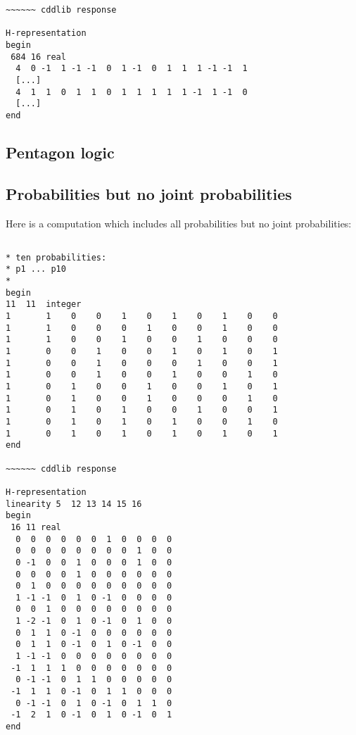 \documentclass[%
 showpacs,
 showkeys,
 preprintnumbers,
 amsmath,amssymb,
 aps,
  pra,
  longbibliography,
 floatfix,
 ]{revtex4-1}
\begin{document}
{\begin{lstlisting}[backgroundcolor=\color{yellow!10},framerule=0pt,breaklines=true, frame=tb]
~~~~~~ cddlib response

H-representation
begin
 684 16 real
  4  0 -1  1 -1 -1  0  1 -1  0  1  1  1 -1 -1  1
  [...]
  4  1  1  0  1  1  0  1  1  1  1  1 -1  1 -1  0
  [...]
end

\end{lstlisting}  }


\subsection{Pentagon logic}

\subsection{Probabilities but no joint probabilities}

Here is a computation which includes all probabilities but no joint probabilities:



{ \begin{lstlisting}[backgroundcolor=\color{yellow!10},framerule=0pt,breaklines=true, frame=tb]

* ten probabilities:
* p1 ... p10
*
begin
11  11  integer
1       1    0    0    1    0    1    0    1    0    0
1       1    0    0    0    1    0    0    1    0    0
1       1    0    0    1    0    0    1    0    0    0
1       0    0    1    0    0    1    0    1    0    1
1       0    0    1    0    0    0    1    0    0    1
1       0    0    1    0    0    1    0    0    1    0
1       0    1    0    0    1    0    0    1    0    1
1       0    1    0    0    1    0    0    0    1    0
1       0    1    0    1    0    0    1    0    0    1
1       0    1    0    1    0    1    0    0    1    0
1       0    1    0    1    0    1    0    1    0    1
end

~~~~~~ cddlib response

H-representation
linearity 5  12 13 14 15 16
begin
 16 11 real
  0  0  0  0  0  0  1  0  0  0  0
  0  0  0  0  0  0  0  0  1  0  0
  0 -1  0  0  1  0  0  0  1  0  0
  0  0  0  0  1  0  0  0  0  0  0
  0  1  0  0  0  0  0  0  0  0  0
  1 -1 -1  0  1  0 -1  0  0  0  0
  0  0  1  0  0  0  0  0  0  0  0
  1 -2 -1  0  1  0 -1  0  1  0  0
  0  1  1  0 -1  0  0  0  0  0  0
  0  1  1  0 -1  0  1  0 -1  0  0
  1 -1 -1  0  0  0  0  0  0  0  0
 -1  1  1  1  0  0  0  0  0  0  0
  0 -1 -1  0  1  1  0  0  0  0  0
 -1  1  1  0 -1  0  1  1  0  0  0
  0 -1 -1  0  1  0 -1  0  1  1  0
 -1  2  1  0 -1  0  1  0 -1  0  1
end

\end{lstlisting}  }
\end{document}
